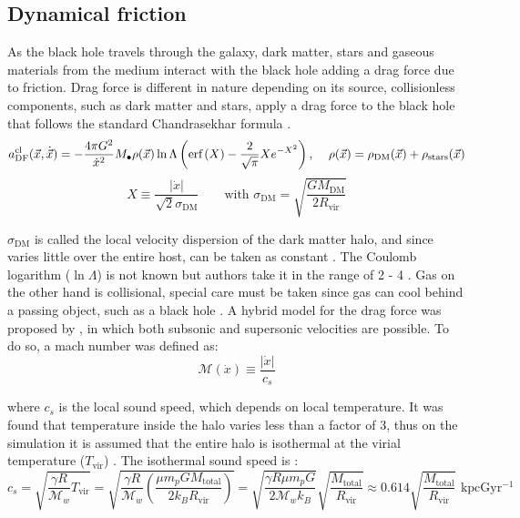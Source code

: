 		\subsection{Dynamical friction}
			As the black hole travels through the galaxy, dark matter, stars and gaseous materials from the medium interact with the black hole adding a drag force due to friction. Drag force is different in nature depending on its source, collisionless components, such as dark matter and stars, apply a drag force to the black hole that follows the standard Chandrasekhar formula \cite{binney2011galactic, madau2004effect, tanaka2009assembly, choksi2017recoiling}.
			\begin{equation}\label{eq: df_cl}
				a_\text{DF}^\text{cl}(\vec{x}, \dot{\vec{x}}) = -\dfrac{4\pi G^2}{\dot{x}^2} M_\bullet\rho(\vec{x})\ln\Lambda\left(\text{erf}\left(X\right) - \dfrac{2}{\sqrt{\pi}}Xe^{-X^2}\right)\text{, } \quad \rho(\vec{x}) = \rho_\text{DM}(\vec{x}) + \rho_\text{stars}(\vec{x})
			\end{equation}
			\begin{equation}
				X \equiv \dfrac{|\dot{x}|}{\sqrt{2}\sigma_\text{DM}} \qquad \text{with } \sigma_\text{DM} = \sqrt{\dfrac{GM_\text{DM}}{2R_\text{vir}}}
			\end{equation}
			
			$\sigma_\text{DM}$ is called the local velocity dispersion of the dark matter halo, and since varies little over the entire host, can be taken as constant \cite{tanaka2009assembly, choksi2017recoiling}. The Coulomb logarithm ($\ln\Lambda$) is not known but authors take it in the range of 2 - 4 \cite{choksi2017recoiling}. Gas on the other hand is collisional, special care must be taken since gas can cool behind a passing object, such as a black hole \cite{choksi2017recoiling}. A hybrid model for the drag force was proposed by \citeauthor{tanaka2009assembly}, in which both subsonic and supersonic velocities are possible. To do so, a mach number was defined as:
			\begin{equation}
				\mathcal{M}(\dot{x}) \equiv \dfrac{|\dot{x}|}{c_s}
			\end{equation}
			
			where $c_s$ is the local sound speed, which depends on local temperature. It was found that temperature inside the halo varies less than a factor of 3, thus on the simulation it is assumed that the entire halo is isothermal at the virial temperature ($T_\text{vir}$) \cite{choksi2017recoiling}. The isothermal sound speed is \cite{barkana2001beginning}:
			\begin{equation}\label{eq: soundSpeed}
				c_s = \sqrt{\dfrac{\gamma R}{\mathcal{M}_w}T_\text{vir}} = \sqrt{\dfrac{\gamma R}{\mathcal{M}_w}\left(\dfrac{\mu m_p G M_\text{total}}{2k_BR_\text{vir}}\right)} = \sqrt{\dfrac{\gamma R\mu m_pG}{2\mathcal{M}_wk_B}} \sqrt{\dfrac{M_\text{total}}{R_\text{vir}}} \approx 0.614 \sqrt{\dfrac{M_\text{total}}{R_\text{vir}}}\text{ kpcGyr$^{-1}$}
			\end{equation}
			
